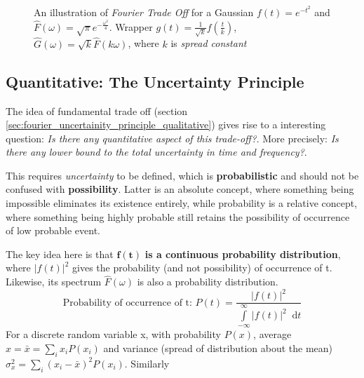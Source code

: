 \documentclass[11pt, a4paper]{article}
\newcommand{\quotedsingle}[1]{#1}	%
\newcommand{\quotedsingleit}[1]{\quotedsingle{\textit{#1}}}	%
\newcommand{\variance}[1]{\sigma_{#1}^{2}}
\newcommand{\diff}{\mathop{}\!\mathrm{d}}
\newcommand{\dt}{\diff t}
\newcommand{\dint}[2]{\int \limits_{#1}^{#2}}  %
\newcommand{\intinfty}{\dint{-\infty}{\infty}}	%
\begin{document}
\begin{figure}[H]
{
		}
		
		
		\caption{An illustration of \textit{Fourier Trade Off} for a Gaussian $f(t) = e^{-t^2}$ and $\hat{F}(\omega) = \sqrt{\pi} e^{-\frac{\omega^2}{4}}$. Wrapper $g(t)=\frac{1}{\sqrt{k}} f \left( \frac{t}{k} \right)$, $\hat{G}(\omega) = \sqrt{k} \hat{F}(k \omega)$, where $k$ is \textit{spread constant}}
		
		\label{fig:fourier_tradeoff}  %
	\end{figure}
	
	\subsection{Quantitative: The Uncertainty Principle}
	The idea of fundamental trade off (section \ref{sec:fourier_uncertainity_principle_qualitative}) gives rise to a interesting question: \textit{Is there any quantitative aspect of this trade-off?}. More precisely: \textit{Is there any lower bound to the total uncertainty in time and frequency?}.
	
	This requires \quotedsingleit{uncertainty} to be defined, which is \textbf{probabilistic} and should not be confused with \textbf{possibility}. Latter is an absolute concept, where something being impossible eliminates its existence entirely, while probability is a relative concept, where something being highly probable still retains the possibility of occurrence of low probable event.
	
	The key idea here is that $\boldsymbol{f(t)}$ \textbf{is a continuous probability distribution}, where $|f(t)|^{2}$ gives the probability (and not possibility) of occurrence of t. Likewise, its spectrum $\hat{F}(\omega)$ is also a probability distribution.
	\begin{equation*}
		\text{Probability of occurrence of t: }P(t) = \frac{|f(t)|^{2}}{\intinfty |f(t)|^{2} \dt}
	\end{equation*}
	For a discrete random variable x, with probability $P(x)$, average $x = \bar{x} = \sum \limits_{i} x_{i} P(x_{i})$ and variance (spread of distribution about the mean) $ \variance{x} = \sum \limits_{i} (x_{i} - \bar{x})^{2} P(x_{i})$. Similarly
	
\end{document}
